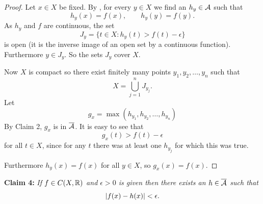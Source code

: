 \begin{proof}
Let $x \in X$ be fixed.
By , for every $y \in X$ we find an $h_y \in
{\mathcal{A}}$ such that
\begin{equation*}
h_y(x) = f(x), \qquad h_y(y)=f(y) .
\end{equation*}
As $h_y$ and $f$ are continuous, the set
\begin{equation*}
J_y = \{ t \in X : h_y(t) > f(t) -\epsilon \}
\end{equation*}
is open (it is the inverse image of an open set by a continuous function).
Furthermore $y \in J_y$.  So the sets $J_y$ cover $X$.

Now $X$ is compact so there exist finitely many points $y_1,y_2,\ldots,y_n$ such
that
\begin{equation*}
X = \bigcup_{j=1}^n J_{y_j}  .
\end{equation*}
Let 
\begin{equation*}
g_x = \max(h_{y_1},h_{y_2},\ldots,h_{y_n})
\end{equation*}
By Claim 2, $g_x$ is in $\overline{{\mathcal{A}}}$.
It is easy to see that
\begin{equation*}
g_x(t) > f(t) -\epsilon
\end{equation*}
for all $t \in X$, since for any $t$ there was at least one $h_{y_j}$ for
which this was true.

Furthermore $h_y(x) = f(x)$ for all $y \in X$, so
$g_x(x) = f(x)$.
\end{proof}

\medskip

\noindent
\textbf{Claim 4:} \emph{If $f \in C(X,{\mathbb{R}})$ and $\epsilon > 0$ is given then there
exists an $h \in \overline{{\mathcal{A}}}$ such that}
\begin{equation*}
\lvert {f(x) - h(x)} \rvert < \epsilon .
\end{equation*}

